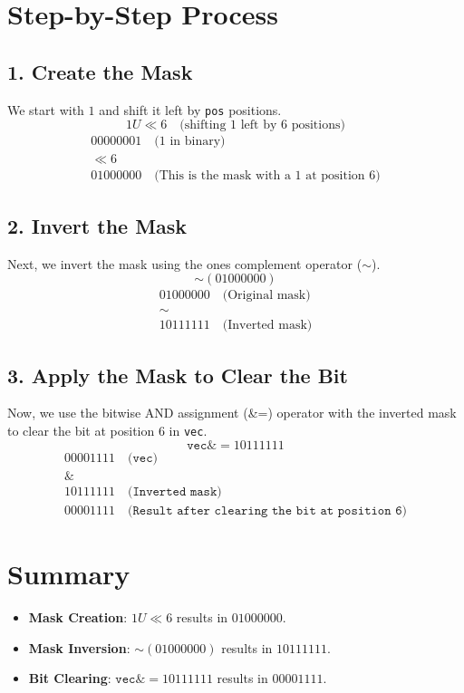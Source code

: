 \documentclass{article}
\begin{document}
\section*{Step-by-Step Process}

\subsection*{1. Create the Mask}
We start with \(1\) and shift it left by \texttt{pos} positions.
\[
1U \ll 6 \quad \text{(shifting 1 left by 6 positions)}
\]
\[
\begin{array}{c}
00000001 \quad \text{(1 in binary)} \\
\ll 6 \\
\hline
01000000 \quad \text{(This is the mask with a 1 at position 6)}
\end{array}
\]

\subsection*{2. Invert the Mask}
Next, we invert the mask using the ones complement operator (\(\sim\)).
\[
\sim(01000000)
\]
\[
\begin{array}{c}
01000000 \quad \text{(Original mask)} \\
\sim \\
\hline
10111111 \quad \text{(Inverted mask)}
\end{array}
\]

\subsection*{3. Apply the Mask to Clear the Bit}
Now, we use the bitwise AND assignment (\&=) operator with the inverted mask to clear the bit at position 6 in \texttt{vec}.
\[
\texttt{vec} \&= 10111111
\]
\[
\begin{array}{c}
00001111 \quad \texttt{(vec)} \\
\& \\
10111111 \quad \texttt{(Inverted mask)} \\
\hline
00001111 \quad \texttt{(Result after clearing the bit at position 6)}
\end{array}
\]

\section*{Summary}
\begin{itemize}
    \item \textbf{Mask Creation}: \(1U \ll 6\) results in \(01000000\).
    \item \textbf{Mask Inversion}: \(\sim(01000000)\) results in \(10111111\).
    \item \textbf{Bit Clearing}: \(\texttt{vec} \&= 10111111\) results in \(00001111\).
\end{itemize}
\end{document}
